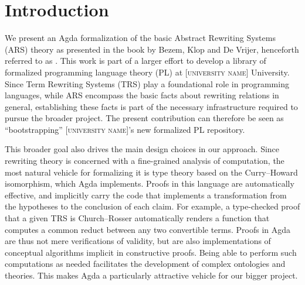 \section{Introduction}

\newcommand{\inreview}[1]{[\textsc{university name}]}

\label{sec:Introduction}

%


We present an Agda formalization of the basic Abstract Rewriting Systems (ARS) theory as presented in the book by Bezem, Klop and De Vrijer,
henceforth referred to as \terese. %
This work is part of a larger effort to develop a library of formalized programming language theory (PL)
at \inreview{Appalachian State} University.
Since Term Rewriting Systems (TRS) play a foundational role in programming languages,
while ARS encompass the basic facts about rewriting relations in general,
establishing these facts is part of the necessary infrastructure required to
pursue the broader project.  The present contribution can therefore be seen as
``bootstrapping'' \inreview{Appalachian State}'s new formalized PL repository.

This broader goal also drives the main design choices in our approach.
Since rewriting theory is concerned with a fine-grained analysis of computation,
the most natural vehicle for formalizing it is type theory based on the
Curry--Howard isomorphism, which Agda implements.  Proofs in this language
are automatically effective, and implicitly carry the code that implements
a transformation from the hypotheses to the conclusion of each claim.  For example,
a type-checked proof that a given TRS is Church--Rosser automatically renders a function that
computes a common reduct between any two convertible terms.
Proofs in Agda are thus not mere verifications of validity, but are also implementations
of conceptual algorithms implicit in constructive proofs.
Being able to perform such computations as needed
facilitates the development of complex ontologies and theories.
This makes Agda a particularly attractive vehicle for our bigger project.


